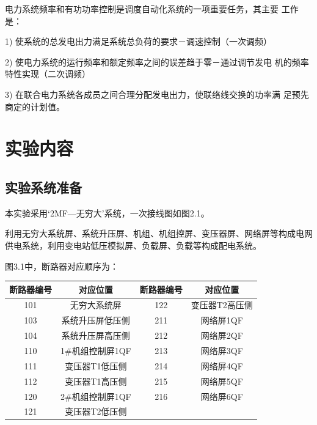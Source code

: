 \documentclass[a4paper]{ctexrep}
\begin{document}
                    电力系统频率和有功功率控制是调度自动化系统的一项重要任务，其主要 工作是： 
                    
                    1) 使系统的总发电出力满足系统总负荷的要求－调速控制（一次调频） 
                    
                    2) 使电力系统的运行频率和额定频率之间的误差趋于零－通过调节发电 机的频率特性实现（二次调频） 
                    
                    3) 在联合电力系统各成员之间合理分配发电出力，使联络线交换的功率满 足预先商定的计划值。

                \section{实验内容}
                    \subsection{实验系统准备}
                        本实验采用‘2MF—无穷大’系统，一次接线图如图2.1。
                    
                        利用无穷大系统屏、系统升压屏、机组、机组控屏、变压器屏、网络屏等构成电网供电系统，利用变电站低压模拟屏、负载屏、负载等构成配电系统。
                        
                        图3.1中，断路器对应顺序为：
                        
                        \begin{center}
                            \begin{tabular}{|c|c|c|c|}
                                \hline
                                断路器编号 & 对应位置 & 断路器编号 & 对应位置 \\ \hline
                                101 & 无穷大系统屏 & 122 & 变压器T2高压侧 \\ \hline
                                103 & 系统升压屏低压侧  & 211 & 网络屏1QF \\ \hline
                                104 & 系统升压屏高压侧 & 212 & 网络屏2QF \\ \hline
                                110 & 1\#机组控制屏1QF & 213 & 网络屏3QF \\ \hline
                                111 & 变压器T1低压侧 & 214 & 网络屏4QF \\ \hline
                                112 & 变压器T1高压侧 & 215 & 网络屏5QF \\ \hline
                                120 & 2\#机组控制屏1QF & 216 & 网络屏6QF \\ \hline
                                121 & 变压器T2低压侧 & & \\
                                \hline
                            \end{tabular}
                        \end{center}
\end{document}
